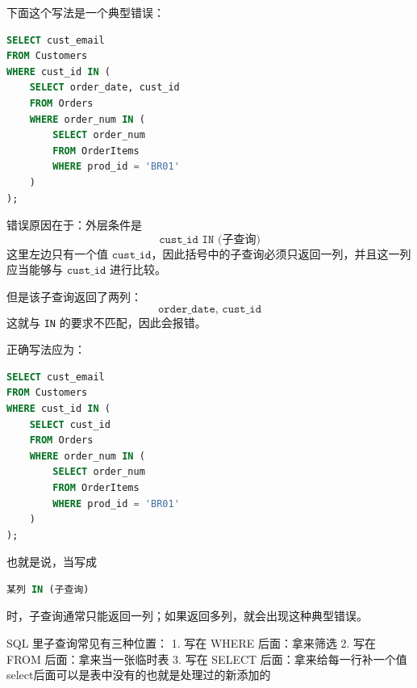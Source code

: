 \begin{example}
下面这个写法是一个典型错误：
\begin{lstlisting}[language=SQL]
SELECT cust_email
FROM Customers
WHERE cust_id IN (
    SELECT order_date, cust_id
    FROM Orders
    WHERE order_num IN (
        SELECT order_num
        FROM OrderItems
        WHERE prod_id = 'BR01'
    )
);
\end{lstlisting}

错误原因在于：外层条件是
\[
\texttt{cust\_id IN (子查询)}
\]
这里左边只有一个值 \(\texttt{cust\_id}\)，因此括号中的子查询必须只返回一列，并且这一列应当能够与 \(\texttt{cust\_id}\) 进行比较。

但是该子查询返回了两列：
\[
\texttt{order\_date,\ cust\_id}
\]
这就与 \texttt{IN} 的要求不匹配，因此会报错。

正确写法应为：
\begin{lstlisting}[language=SQL]
SELECT cust_email
FROM Customers
WHERE cust_id IN (
    SELECT cust_id
    FROM Orders
    WHERE order_num IN (
        SELECT order_num
        FROM OrderItems
        WHERE prod_id = 'BR01'
    )
);
\end{lstlisting}

也就是说，当写成
\begin{lstlisting}[language=SQL]
某列 IN (子查询)
\end{lstlisting}
时，子查询通常只能返回一列；如果返回多列，就会出现这种典型错误。
\end{example}
\begin{note}
    SQL 里子查询常见有三种位置：
	1.	写在 WHERE 后面：拿来筛选
	2.	写在 FROM 后面：拿来当一张临时表
	3.	写在 SELECT 后面：拿来给每一行补一个值
    select后面可以是表中没有的也就是处理过的新添加的
\end{note}
